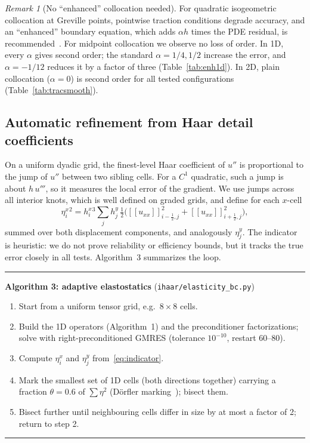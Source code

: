 \documentclass[preprint,12pt]{elsarticle}
\theoremstyle{remark}
\newtheorem{remark}{Remark}
\begin{document}
\begin{remark}[No ``enhanced'' collocation needed]
For quadratic isogeometric collocation at Greville points, pointwise traction conditions degrade
accuracy, and an ``enhanced'' boundary equation, which adds $\alpha h$ times the PDE residual, is
recommended~\cite{delorenzis2015isogeometric}. For midpoint collocation we observe no loss of order.
In 1D, every $\alpha$ gives second order; the standard $\alpha=1/4,1/2$ increase the error, and
$\alpha=-1/12$ reduces it by a factor of three (Table~\ref{tab:enh1d}). In 2D, plain collocation
($\alpha=0$) is second order for all tested configurations (Table~\ref{tab:tracsmooth}).
\end{remark}

\subsection{Automatic refinement from Haar detail coefficients}\label{sec:adapt}
On a uniform dyadic grid, the finest-level Haar coefficient of $u''$ is proportional to the jump of
$u''$ between two sibling cells. For a $C^1$ quadratic, such a jump is about $h\,u'''$, so it measures
the local error of the gradient. We use jumps across all interior knots, which is well defined on graded
grids, and define for each $x$-cell
\begin{equation}\label{eq:indicator}
\eta^x_i{}^2=h^x_i{}^3\sum_jh^y_j\,\tfrac12\Big([\![u_{xx}]\!]_{i-\frac12,j}^2+[\![u_{xx}]\!]_{i+\frac12,j}^2\Big),
\end{equation}
summed over both displacement components, and analogously $\eta^y_j$. The indicator is heuristic: we
do not prove reliability or efficiency bounds, but it tracks the true error closely in all tests.
Algorithm~3 summarizes the loop.

\begin{algorithm}[t]\small\hrule\smallskip
\textbf{Algorithm 3: adaptive elastostatics} (\texttt{ihaar/elasticity\_bc.py})
\begin{enumerate}
\item Start from a uniform tensor grid, e.g.\ $8\times8$ cells.
\item Build the 1D operators (Algorithm~1) and the preconditioner factorizations; solve with
right-preconditioned GMRES (tolerance $10^{-10}$, restart 60--80).
\item Compute $\eta^x_i$ and $\eta^y_j$ from~\eqref{eq:indicator}.
\item Mark the smallest set of 1D cells (both directions together) carrying a fraction $\theta=0.6$ of
$\sum\eta^2$ (D\"orfler marking~\cite{dorfler1996convergent}); bisect them.
\item Bisect further until neighbouring cells differ in size by at most a factor of 2; return to step 2.
\end{enumerate}
\hrule
\end{algorithm}
\end{document}
